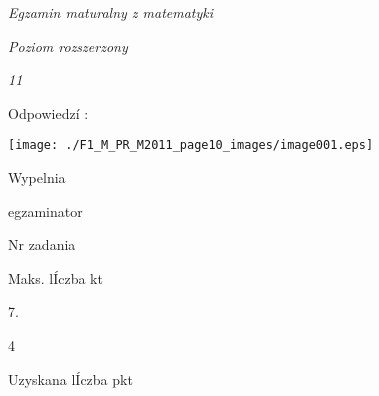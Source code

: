\documentclass[a4paper,12pt]{article}
\begin{document}
{\it Egzamin maturalny z matematyki}

{\it Poziom rozszerzony}

{\it 11}

Odpowiedzí :
\begin{center}
\texttt{[image: ./F1\_M\_PR\_M2011\_page10\_images/image001.eps]}
\end{center}
Wypelnia

egzaminator

Nr zadania

Maks. lÍczba kt

7.

4

Uzyskana lÍczba pkt
\end{document}
